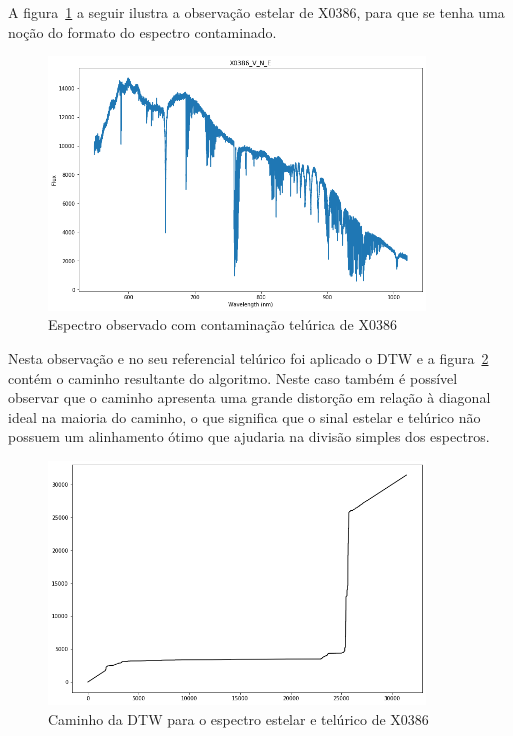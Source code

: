 A figura~\ref{fig:x0386-v-n-e} a seguir ilustra a observação estelar de X0386, para que se tenha uma noção do formato do espectro contaminado.

\begin{figure}[htb]
\centering
\includegraphics[width=10cm]{figuras/x0386_v_n_e_spectrum.png}
\caption{Espectro observado com contaminação telúrica de X0386}
\label{fig:x0386-v-n-e}
\end{figure}

Nesta observação e no seu referencial telúrico foi aplicado o DTW e a figura~\ref{fig:x0386-warp-path} contém o caminho resultante do algoritmo. Neste caso também é possível observar que o caminho apresenta uma grande distorção em relação à diagonal ideal na maioria do caminho, o que significa que o sinal estelar e telúrico não possuem um alinhamento ótimo que ajudaria na divisão simples dos espectros.

\begin{figure}[htb]
\centering
\includegraphics[width=10cm]{figuras/x0386_warp_path.png}
\caption{Caminho da DTW para o espectro estelar e telúrico de X0386}
\label{fig:x0386-warp-path}
\end{figure}

